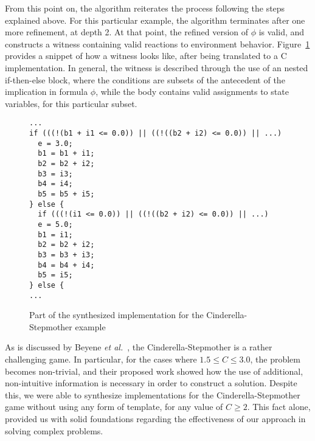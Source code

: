 From this point on, the algorithm reiterates the process following the steps
explained above. For this particular example, the algorithm terminates after one
more refinement, at depth 2. At that point, the refined version of
$\phi$ is valid, and \aeval constructs a witness containing valid reactions to
environment behavior. Figure~\ref{fg:witness} provides a snippet of how a
witness looks like, after being translated to a C implementation. In general,
the witness is described through the use of an nested if-then-else block, where the conditions are subsets of the antecedent of
the implication in formula $\phi$, while the body contains valid assignments to
state variables, for this particular subset.


\begin{figure}[!t]
\centering
 \begin{Verbatim}[fontsize=\scriptsize]
...
if (((!(b1 + i1 <= 0.0)) || ((!((b2 + i2) <= 0.0)) || ...)
  e = 3.0;
  b1 = b1 + i1;
  b2 = b2 + i2;
  b3 = i3;
  b4 = i4;
  b5 = b5 + i5;
} else {
  if (((!(i1 <= 0.0)) || ((!((b2 + i2) <= 0.0)) || ...)
  e = 5.0;
  b1 = i1;
  b2 = b2 + i2;
  b3 = b3 + i3;
  b4 = b4 + i4;
  b5 = i5;
} else {
...
 \end{Verbatim}
\caption{Part of the synthesized implementation for the Cinderella-Stepmother
example}
\label{fg:witness}
\end{figure}

As is discussed by Beyene \textit{et al.}~\cite{beyene2014constraint}, the
Cinderella-Stepmother is a rather challenging game. In particular, for the
cases where $1.5 \leq C \leq 3.0$, the problem becomes non-trivial, and their
proposed work showed how the use of additional, non-intuitive information is
necessary in order to construct a solution. Despite this, we were able to
synthesize implementations for the Cinderella-Stepmother game without using any form of template, for any value of $C \geq 2$.
This fact alone, provided us with solid foundations regarding the effectiveness of our approach in solving
complex problems.
